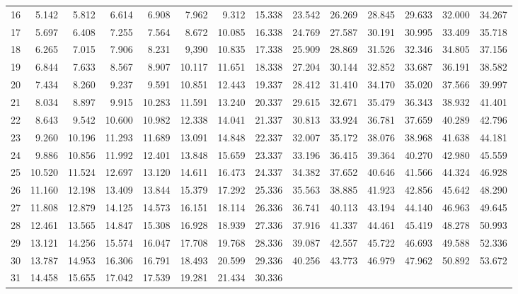 {\begin{tabular} {r|rrrr|rrrrr|rrrr}
\hline
 16 & 5.142 & 5.812 & 6.614 & 6.908 & 7.962 & 9.312 & 15.338 &
      23.542 & 26.269 & 28.845 & 29.633 & 32.000 & 34.267 \\
 17 & 5.697 & 6.408 & 7.255 & 7.564 & 8.672 & 10.085 & 16.338 &
      24.769 & 27.587 & 30.191 & 30.995 & 33.409 & 35.718 \\
 18 & 6.265 & 7.015 & 7.906 & 8.231 & 9,390 & 10.835 & 17.338 & 
      25.909 & 28.869 & 31.526 & 32.346 & 34.805 & 37.156 \\
 19 & 6.844 & 7.633 & 8.567 & 8.907 & 10.117 & 11.651 & 18.338 &
      27.204 & 30.144 & 32.852 & 33.687 & 36.191 & 38.582 \\
 20 & 7.434 & 8.260 & 9.237 & 9.591 & 10.851 & 12.443 & 19.337 &
      28.412 & 31.410 & 34.170 & 35.020 & 37.566 & 39.997 \\
\hline
 21 & 8.034 & 8.897 & 9.915 & 10.283 & 11.591 & 13.240 & 20.337 &
      29.615 & 32.671 & 35.479 & 36.343 & 38.932 & 41.401 \\
 22 & 8.643 & 9.542 & 10.600 & 10.982 & 12.338 & 14.041 & 21.337 &
      30.813 & 33.924 & 36.781 & 37.659 & 40.289 & 42.796 \\
 23 & 9.260 & 10.196 & 11.293 & 11.689 & 13.091 & 14.848 & 22.337 &
      32.007 & 35.172 & 38.076 & 38.968 & 41.638 & 44.181 \\
 24 & 9.886 & 10.856 & 11.992 & 12.401 & 13.848 & 15.659 & 23.337 &
      33.196 & 36.415 & 39.364 & 40.270 & 42.980 & 45.559 \\
 25 & 10.520 & 11.524 & 12.697 & 13.120 & 14.611 & 16.473 & 24.337 &
      34.382 & 37.652 & 40.646 & 41.566 & 44.324 & 46.928 \\
\hline
 26 & 11.160 & 12.198 & 13.409 & 13.844 & 15.379 & 17.292 & 25.336 & 
      35.563 & 38.885 & 41.923 & 42.856 & 45.642 & 48.290 \\
 27 & 11.808 & 12.879 & 14.125 & 14.573 & 16.151 & 18.114 & 26.336 & 
      36.741 & 40.113 & 43.194 & 44.140 & 46.963 & 49.645 \\
 28 & 12.461 & 13.565 & 14.847 & 15.308 & 16.928 & 18.939 & 27.336 & 
      37.916 & 41.337 & 44.461 & 45.419 & 48.278 & 50.993 \\
 29 & 13.121 & 14.256 & 15.574 & 16.047 & 17.708 & 19.768 & 28.336 & 
      39.087 & 42.557 & 45.722 & 46.693 & 49.588 & 52.336 \\
 30 & 13.787 & 14.953 & 16.306 & 16.791 & 18.493 & 20.599 & 29.336 & 
      40.256 & 43.773 & 46.979 & 47.962 & 50.892 & 53.672 \\
\hline
 31 & 14.458 & 15.655 & 17.042 & 17.539 & 19.281 & 21.434 & 30.336 & 

\end{tabular}}

